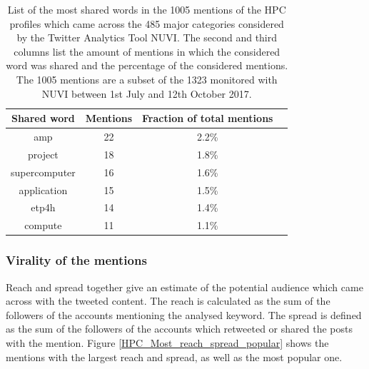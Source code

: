 \begin{table}[t]
 \begin{center}
  \begin{tabular}{cccc}
   \hline 
   \hline
   Shared word & Mentions & Fraction of total mentions \\ 
   \hline
   \hline
   amp & 22 & 2.2\% \\
   project & 18 & 1.8\% \\
   supercomputer & 16 & 1.6\% \\
   application & 15 & 1.5\% \\
   etp4h & 14 & 1.4\% \\
   compute & 11 & 1.1\% \\
   \hline
   \hline
  \end{tabular}
 \end{center} 
 \caption{List of the most shared words in the 1005 mentions of the HPC profiles which came across the 485 major categories considered by the Twitter Analytics Tool NUVI. The second and third columns list the amount of mentions in which the considered word was shared and the percentage of the considered mentions. The 1005 mentions are a subset of the 1323 monitored with NUVI between 1st July and 12th October 2017.}
\label{Most_shared_words} 
\end{table}

\subsubsection{Virality of the mentions}
Reach and spread together give an estimate of the potential audience which came across with the tweeted content. The reach is calculated as the sum of the followers of the accounts mentioning the analysed keyword. The spread is defined as the sum of the followers of the accounts which retweeted or shared the posts with the mention. Figure \ref{HPC_Most_reach_spread_popular} shows the mentions with the largest reach and spread, as well as the most popular one. 

